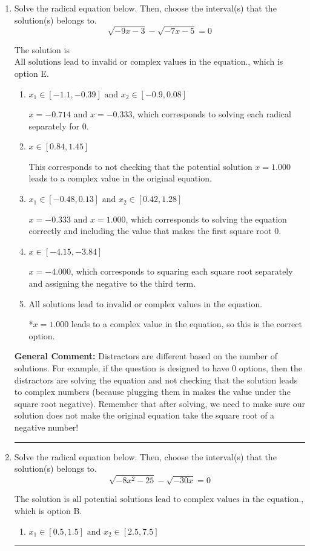 \documentclass{extbook}[14pt]
\newcommand{\litem}[1]{\item #1

\rule{\textwidth}{0.4pt}}
\begin{document}
\begin{enumerate}\litem{
Solve the radical equation below. Then, choose the interval(s) that the solution(s) belongs to.
\[ \sqrt{-9 x - 3} - \sqrt{-7 x - 5} = 0 \]

The solution is \( \text{All solutions lead to invalid or complex values in the equation.} \), which is option E.\begin{enumerate}[label=\Alph*.]
\item \( x_1 \in [-1.1, -0.39] \text{ and } x_2 \in [-0.9,0.08] \)

$x = -0.714$ and $x = -0.333$, which corresponds to solving each radical separately for 0.
\item \( x \in [0.84,1.45] \)

This corresponds to not checking that the potential solution $x = 1.000$ leads to a complex value in the original equation.
\item \( x_1 \in [-0.48, 0.13] \text{ and } x_2 \in [0.42,1.28] \)

$x = -0.333$ and $x = 1.000$, which corresponds to solving the equation correctly and including the value that makes the first square root 0.
\item \( x \in [-4.15,-3.84] \)

$x = -4.000$, which corresponds to squaring each square root separately and assigning the negative to the third term.
\item \( \text{All solutions lead to invalid or complex values in the equation.} \)

*$x = 1.000$ leads to a complex value in the equation, so this is the correct option.
\end{enumerate}

\textbf{General Comment:} Distractors are different based on the number of solutions. For example, if the question is designed to have 0 options, then the distractors are solving the equation and not checking that the solution leads to complex numbers (because plugging them in makes the value under the square root negative). Remember that after solving, we need to make sure our solution does not make the original equation take the square root of a negative number!
}
\litem{
Solve the radical equation below. Then, choose the interval(s) that the solution(s) belongs to.
\[ \sqrt{-8 x^2 - 25} - \sqrt{-30 x} = 0 \]

The solution is \( \text{all potential solutions lead to complex values in the equation.} \), which is option B.\begin{enumerate}[label=\Alph*.]
\item \( x_1 \in [0.5, 1.5] \text{ and } x_2 \in [2.5,7.5] \)


\end{enumerate}}
\end{enumerate}
\end{document}
